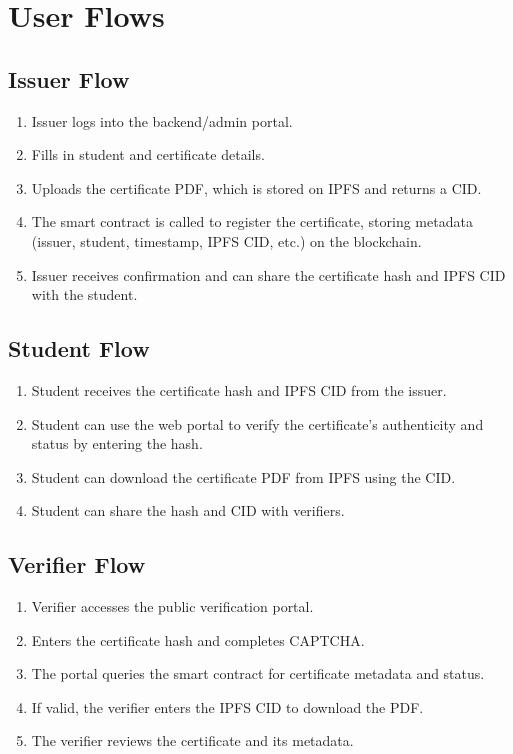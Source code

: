 \documentclass{article}
\begin{document}
\section{User Flows}
\subsection{Issuer Flow}
\begin{enumerate}
    \item Issuer logs into the backend/admin portal.
    \item Fills in student and certificate details.
    \item Uploads the certificate PDF, which is stored on IPFS and returns a CID.
    \item The smart contract is called to register the certificate, storing metadata (issuer, student, timestamp, IPFS CID, etc.) on the blockchain.
    \item Issuer receives confirmation and can share the certificate hash and IPFS CID with the student.
\end{enumerate}

\subsection{Student Flow}
\begin{enumerate}
    \item Student receives the certificate hash and IPFS CID from the issuer.
    \item Student can use the web portal to verify the certificate's authenticity and status by entering the hash.
    \item Student can download the certificate PDF from IPFS using the CID.
    \item Student can share the hash and CID with verifiers.
\end{enumerate}

\subsection{Verifier Flow}
\begin{enumerate}
    \item Verifier accesses the public verification portal.
    \item Enters the certificate hash and completes CAPTCHA.
    \item The portal queries the smart contract for certificate metadata and status.
    \item If valid, the verifier enters the IPFS CID to download the PDF.
    \item The verifier reviews the certificate and its metadata.
\end{enumerate}
\end{document}
